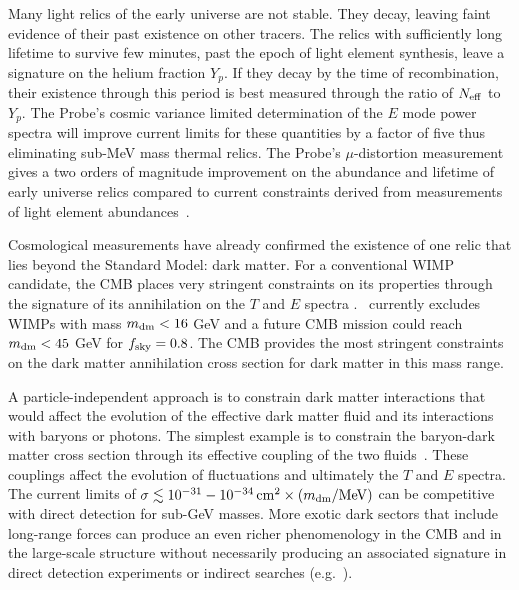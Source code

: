 Many light relics of the early universe are not stable. They decay, 
leaving faint evidence of their past existence on other tracers. The relics with sufficiently long lifetime to survive few minutes, 
past the epoch of light element synthesis, leave a signature on the helium fraction $Y_p$.  If they decay 
by the time of recombination, their existence through this period is best measured through the ratio of ${N_{\rm eff}}$ to $Y_p$. 
The Probe's cosmic variance limited determination 
of the $E$ mode power spectra will improve current limits for these quantities by
a factor of five thus eliminating sub-MeV mass thermal relics. 
The Probe's $\mu$-distortion measurement gives a two orders of magnitude improvement on the 
abundance and lifetime of early universe relics compared 
to current constraints derived from measurements of light element 
abundances~\cite{Chluba2013fore, Chluba2013PCA,Kawasaki2005, Jedamzik2006}.

Cosmological measurements have already confirmed the existence of one relic that lies beyond the 
Standard Model: dark matter. For a conventional WIMP candidate, the CMB places very stringent 
constraints on its properties through the signature of its annihilation on the $T$ and $E$ 
spectra \citep{Peebles2000, Chen2004, Padmanabhan2005}.  \planck\ currently excludes WIMPs with mass 
$m_{\rm dm}< 16$ GeV and a future CMB mission could reach $m_{\rm dm} < 45$ GeV for $f_{\rm sky} =0.8$.  The 
CMB provides the most stringent constraints on the dark matter annihilation cross section for dark matter 
in this mass range.  


A particle-independent approach is to constrain dark matter interactions that would 
affect the evolution of the effective dark matter fluid and its interactions with baryons or photons.  The simplest example is 
to constrain the baryon-dark matter cross section through its effective coupling of the two fluids~\cite{Dvorkin:2013cea}.  
These couplings affect the evolution of fluctuations and ultimately the $T$ and $E$ spectra. The current limits of $\sigma \lesssim 10^{-31}-10^{-34}\,{\rm cm}^2 \times (m_{\rm dm} / {\rm MeV})$ can be competitive with direct detection for sub-GeV masses.  
More exotic dark sectors that include long-range forces can produce an even richer phenomenology in the CMB and in the large-scale structure 
without necessarily producing an associated signature in direct detection experiments or 
indirect searches (e.g.~\cite{Cyr-Racine:2013fsa,Buen-Abad:2015ova,Lesgourgues:2015wza}). 

